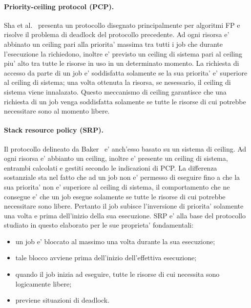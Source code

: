 \paragraph{Priority-ceiling protocol (PCP).} Sha et al.~\cite{Sha:1990:PIP:102822.626613} presenta un protocollo disegnato principalmente per algoritmi FP e risolve il problema di deadlock del protocollo precedente. Ad ogni risorsa e' abbinato un ceiling pari alla priorita' massima tra tutti i job che durante l'esecuzione la richiedono, inoltre e' previsto un ceiling di sistema pari al ceiling piu' alto tra tutte le risorse in uso in un determinato momento. La richiesta di accesso da parte di un job e' soddisfatta solamente se la sua priorita' e' superiore al ceiling di sistema; una volta ottenuta la risorsa, se nesessario, il ceiling di sistema viene innalazato. Questo meccanismo di ceiling garantisce che una richiesta di un job venga soddisfatta solamente se tutte le risorse di cui potrebbe necessitare sono al momento libere.\\

\paragraph{Stack resource policy (SRP).} Il protocollo delineato da Baker~\cite{Baker:1991:SSR:113595.113601} e' anch'esso basato su un sistema di ceiling. Ad ogni risorsa e' abbianto un ceiling, inoltre e' presente un ceiling di sistema, entrambi calcolati e gestiti secondo le indicazioni di PCP. La differenza sostanziale sta nel fatto che ad un job non e' permesso di eseguire fino a che la sua priorita' non e' superiore al ceiling di sistema, il comportamento che ne consegue e' che un job esegue solamente se tutte le risorse di cui potrebbe necessitare sono libere. Pertanto il job subisce l'inversione di priorita' solamente una volta e prima dell'inizio della sua esecuzione. SRP e' alla base del protocollo studiato in questo elaborato per le sue proprieta' fondamentali:

\begin{itemize}
\item un job e’ bloccato al massimo una volta durante la sua esecuzione;
\item tale blocco avviene prima dell’inizio dell’effettiva esecuzione;
\item quando il job inizia ad eseguire, tutte le risorse di cui necessita sono logicamente libere;
\item previene situazioni di deadlock.
\end{itemize}

